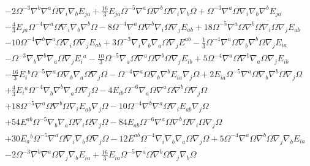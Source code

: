 \documentclass[10pt,letterpaper]{article}
\numberwithin{equation}{section}
\begin{document}
\begin{eqnarray}
&& - 2 \Omega^{-3} \nabla^{b}\nabla^{a}\Omega \nabla_{i}\nabla_{b}E_{ja}
+ \tfrac{16}{3} E_{ja} \Omega^{-5} \nabla^{a}\Omega \nabla^{b}\Omega \nabla_{i}\nabla_{b}\Omega
+ \Omega^{-3} \nabla^{a}\Omega \nabla_{i}\nabla_{b}\nabla^{b}E_{ja}\nonumber\\
&& -  \tfrac{4}{3} E_{ja} \Omega^{-4} \nabla^{a}\Omega \nabla_{i}\nabla_{b}\nabla^{b}\Omega
- 8 \Omega^{-4} \nabla^{a}\Omega \nabla^{b}\nabla_{i}\Omega \nabla_{j}E_{ab}
+ 18 \Omega^{-5} \nabla^{a}\Omega \nabla^{b}\Omega \nabla_{i}\Omega \nabla_{j}E_{ab}\nonumber\\
&& - 10 \Omega^{-4} \nabla^{b}\nabla^{a}\Omega \nabla_{i}\Omega \nabla_{j}E_{ab}
+ 3 \Omega^{-3} \nabla_{i}\nabla_{b}\nabla_{a}\Omega \nabla_{j}E^{ab}
-  \tfrac{1}{3} \Omega^{-4} \nabla^{a}\Omega \nabla_{b}\nabla^{b}\Omega \nabla_{j}E_{ia}\nonumber\\
&& -  \Omega^{-3} \nabla_{b}\nabla^{b}\nabla_{a}\Omega \nabla_{j}E_{i}{}^{a}
-  \tfrac{10}{3} \Omega^{-5} \nabla_{a}\Omega \nabla^{a}\Omega \nabla^{b}\Omega \nabla_{j}E_{ib}
+ 5 \Omega^{-4} \nabla^{a}\Omega \nabla^{b}\nabla_{a}\Omega \nabla_{j}E_{ib}\nonumber\\
&& -  \tfrac{16}{3} E_{i}{}^{b} \Omega^{-5} \nabla^{a}\Omega \nabla_{b}\nabla_{a}\Omega \nabla_{j}\Omega
-  \Omega^{-4} \nabla^{a}\Omega \nabla_{b}\nabla^{b}E_{ia} \nabla_{j}\Omega
+ 2 E_{ia} \Omega^{-5} \nabla^{a}\Omega \nabla_{b}\nabla^{b}\Omega \nabla_{j}\Omega\nonumber\\
&& + \tfrac{4}{3} E_{i}{}^{a} \Omega^{-4} \nabla_{b}\nabla^{b}\nabla_{a}\Omega \nabla_{j}\Omega
- 4 E_{ib} \Omega^{-6} \nabla_{a}\Omega \nabla^{a}\Omega \nabla^{b}\Omega \nabla_{j}\Omega\nonumber\\
&& + 18 \Omega^{-5} \nabla^{a}\Omega \nabla^{b}\Omega \nabla_{i}E_{ab} \nabla_{j}\Omega
- 10 \Omega^{-4} \nabla^{b}\nabla^{a}\Omega \nabla_{i}E_{ab} \nabla_{j}\Omega\nonumber\\
&& + 54 E^{ab} \Omega^{-5} \nabla_{b}\nabla_{a}\Omega \nabla_{i}\Omega \nabla_{j}\Omega
- 84 E_{ab} \Omega^{-6} \nabla^{a}\Omega \nabla^{b}\Omega \nabla_{i}\Omega \nabla_{j}\Omega\nonumber\\
&& + 30 E_{a}{}^{b} \Omega^{-5} \nabla^{a}\Omega \nabla_{i}\nabla_{b}\Omega \nabla_{j}\Omega
- 12 E^{ab} \Omega^{-4} \nabla_{i}\nabla_{b}\nabla_{a}\Omega \nabla_{j}\Omega
+ 5 \Omega^{-4} \nabla^{a}\Omega \nabla^{b}\Omega \nabla_{j}\nabla_{b}E_{ia}\nonumber\\
&& - 2 \Omega^{-3} \nabla^{b}\nabla^{a}\Omega \nabla_{j}\nabla_{b}E_{ia}
+ \tfrac{16}{3} E_{ia} \Omega^{-5} \nabla^{a}\Omega \nabla^{b}\Omega \nabla_{j}\nabla_{b}\Omega

\end{eqnarray}
\end{document}
